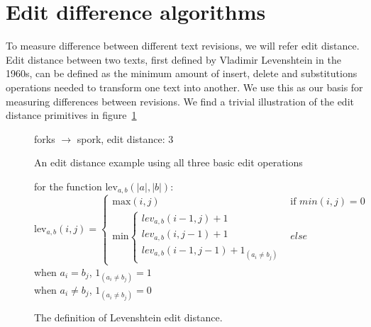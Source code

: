 \section{Edit difference algorithms}
To measure difference between different text revisions, we will refer
edit distance. Edit distance between two texts, first defined by
Vladimir Levenshtein in the 1960s,\cite{Levenshtein1966} can be
defined as the minimum amount of insert, delete and substitutions
operations needed to transform one text into another. We use this as
our basis for measuring differences between revisions. We find a
trivial illustration of the edit distance primitives in
figure~\ref{fig:fork-spork}

\begin{figure}
  \centering
  

  \vspace{3 mm}

  forks $\rightarrow$ spork, edit distance: 3
  
  \caption{An edit distance example using all three basic edit
    operations}
  \label{fig:fork-spork}
\end{figure}

\begin{figure}
  \centering
  for the function $\mbox{lev}_{a,b}(|a|,|b|)$:\\
  $$\mbox{lev}_{a,b}(i,j) = 
  \left\{
  \begin{array}{ll}
    \mbox{max}(i,j) & \mbox{if }min(i,j) = 0\\
    \mbox{min}\left\{
    \begin{array}{lll}
      lev_{a,b}(i-1,j)+1\\
      lev_{a,b}(i,j-1)+1\\
      lev_{a,b}(i-1,j-1)+1_{(a_i{\neq}b_j)}
    \end{array}
    \right.
    & else 
  \end{array}
  \right.$$
  when $a_i = b_j$, $1_{(a_i{\neq}b_j)} = 1$\\
  when  $a_i \neq b_j$, $1_{(a_i{\neq}b_j)} = 0$
  \caption{The definition of Levenshtein edit distance.}
  \label{fig:levdef}
\end{figure}

